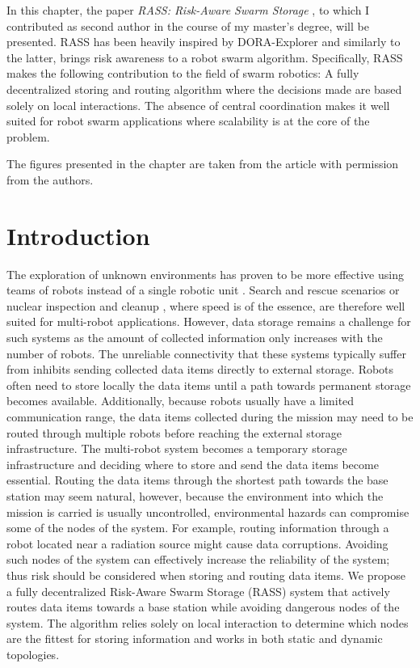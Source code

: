 \label{sec:Theme2}

In this chapter, the paper \textit{RASS: Risk-Aware Swarm Storage} \cite{arseneault2022rass}, to which I contributed as second author in the course of my master's degree, will be presented. RASS has been heavily inspired by DORA-Explorer and similarly to the latter, brings risk awareness to a robot swarm algorithm. Specifically, RASS makes the following contribution to the field of swarm robotics: A fully decentralized storing and routing algorithm where the decisions made are based solely on local interactions. The absence of central coordination makes it well suited for robot swarm applications where scalability is at the core of the problem.

The figures presented in the chapter are taken from the article \cite{arseneault2022rass} with permission from the authors. 


\section{Introduction}
The exploration of unknown environments has proven to be more effective using teams of robots instead of a single robotic unit \cite{burgard2005coordinated}. Search and rescue scenarios \cite{kantor2003search} or nuclear inspection and cleanup \cite{schwagerMultirobotControlPolicy2017}, where speed is of the essence, are therefore well suited for multi-robot applications. However, data storage remains a challenge for such systems as the amount of collected information only increases with the number of robots. The unreliable connectivity that these systems typically suffer from \cite{amigoni2017multirobot} inhibits sending collected data items directly to external storage. Robots often need to store locally the data items until a path towards permanent storage becomes available. Additionally, because robots usually have a limited communication range, the data items collected during the mission may need to be routed through multiple robots before reaching the external storage infrastructure. The multi-robot system becomes a temporary storage infrastructure and deciding where to store and send the data items become essential. Routing the data items through the shortest path towards the base station may seem natural, however, because the environment into which the mission is carried is usually uncontrolled, environmental hazards can compromise some of the nodes of the system. For example, routing information through a robot located near a radiation source might cause data corruptions. Avoiding such nodes of the system can effectively increase the reliability of the system; thus risk should be considered when storing and routing data items. We propose a fully decentralized Risk-Aware Swarm Storage (RASS) system that actively routes data items towards a base station while avoiding dangerous nodes of the system. The algorithm relies solely on local interaction to determine which nodes are the fittest for storing information and works in both static and dynamic topologies.


